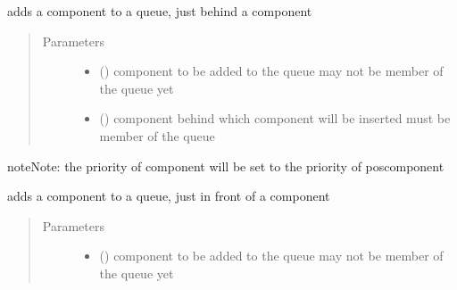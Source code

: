 \documentclass[letterpaper,10pt,english]{sphinxmanual}
\begin{document}
\begin{fulllineitems}

\begin{fulllineitems}
\label{\detokenize{Reference:salabim.Queue.add_behind}}
adds a component to a queue, just behind a component
\begin{quote}\begin{description}
\item[{Parameters}] \leavevmode\begin{itemize}
\item {} 
 ({\hyperref[\detokenize{Reference:salabim.Component}]{}}) \textendash{} component to be added to the queue 
may not be member of the queue yet

\item {} 
 ({\hyperref[\detokenize{Reference:salabim.Component}]{}}) \textendash{} component behind which component will be inserted 
must be member of the queue

\end{itemize}

\end{description}\end{quote}

\begin{sphinxadmonition}{note}{Note:}
the priority of component will be set to the priority of poscomponent
\end{sphinxadmonition}

\end{fulllineitems}


\begin{fulllineitems}
\label{\detokenize{Reference:salabim.Queue.add_in_front_of}}
adds a component to a queue, just in front of a component
\begin{quote}\begin{description}
\item[{Parameters}] \leavevmode\begin{itemize}
\item {} 
 ({\hyperref[\detokenize{Reference:salabim.Component}]{}}) \textendash{} component to be added to the queue 
may not be member of the queue yet


\end{itemize}
\end{description}
\end{quote}
\end{fulllineitems}
\end{fulllineitems}
\end{document}
